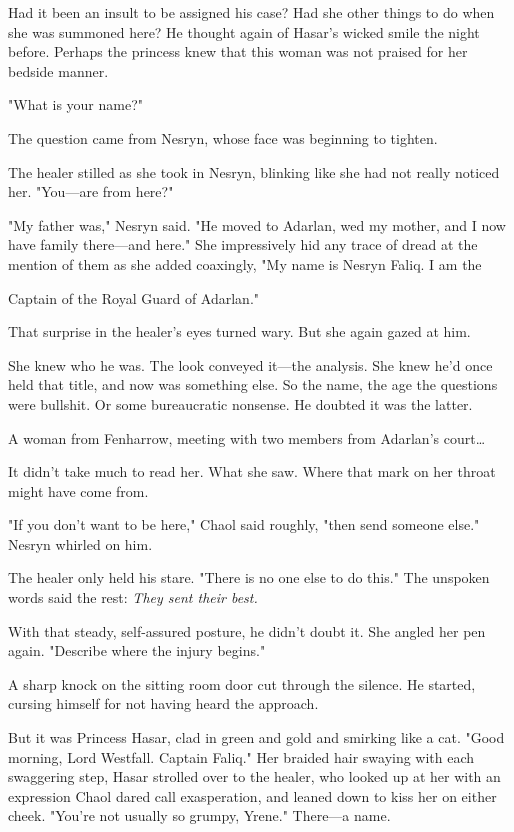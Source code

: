 Had it been an insult to be assigned his case? Had she other things to do when she was summoned here? He thought again of Hasar's wicked smile the night before. Perhaps the princess knew that this woman was not praised for her bedside manner.

"What is your name?"

The question came from Nesryn, whose face was beginning to tighten.

The healer stilled as she took in Nesryn, blinking like she had not really noticed her. "You---are from here?"

"My father was," Nesryn said. "He moved to Adarlan, wed my mother, and I now have family there---and here." She impressively hid any trace of dread at the mention of them as she added coaxingly, "My name is Nesryn Faliq. I am the

Captain of the Royal Guard of Adarlan."

That surprise in the healer's eyes turned wary. But she again gazed at him.

She knew who he was. The look conveyed it---the analysis. She knew he'd once held that title, and now was something else. So the name, the age the questions were bullshit. Or some bureaucratic nonsense. He doubted it was the latter.

A woman from Fenharrow, meeting with two members from Adarlan's court\ldots

It didn't take much to read her. What she saw. Where that mark on her throat might have come from.

"If you don't want to be here," Chaol said roughly, "then send someone else." Nesryn whirled on him.

The healer only held his stare. "There is no one else to do this." The unspoken words said the rest: \emph{They sent their best.}

With that steady, self-assured posture, he didn't doubt it. She angled her pen again. "Describe where the injury begins."

A sharp knock on the sitting room door cut through the silence. He started, cursing himself for not having heard the approach.

But it was Princess Hasar, clad in green and gold and smirking like a cat. "Good morning, Lord Westfall. Captain Faliq." Her braided hair swaying with each swaggering step, Hasar strolled over to the healer, who looked up at her with an expression Chaol dared call exasperation, and leaned down to kiss her on either cheek. "You're not usually so grumpy, Yrene." There---a name.

